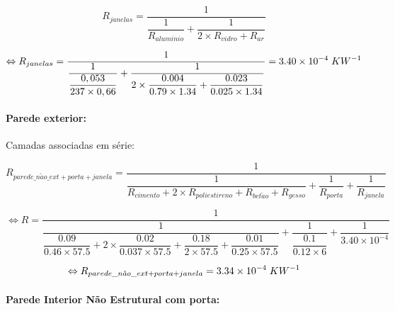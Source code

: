 \documentclass[12pt, a4paper]{article}
\begin{document}
\begin{equation}
	R_{janelas} = \dfrac{1}{\dfrac{1}{R_{aluminio}} + \dfrac{1}{2 \times R_{vidro} + R_{ar}}}
	\label{eq:zona_b_janelas}
\end{equation}

\begin{equation}
	\Leftrightarrow
	R_{janelas} =
	\dfrac{1}{
		\dfrac{1}{
			\dfrac{0,053}{237 \times 0,66}
		}+
		\dfrac{1}{
			2 \times \dfrac{0.004}{0.79 \times 1.34} +
			\dfrac{0.023}{0.025 \times 1.34}
		}
	}
		= 3.40 \times 10^{-4} \hspace{1mm} KW^{-1}
	\label{eq:zona_b_janelas2}
\end{equation}


\paragraph{Parede exterior:}\label{par:zona_b_ext}Camadas associadas em série:

\begin{equation}
    R_{parede\_n\tilde{a}o\_ext + porta + janela} =
        \dfrac{1}{
			\dfrac{1}{
			R_{cimento} + 2 \times R_{poliestireno} + R_{bet\tilde{a}o} + R_{gesso}
			}
			+
			\dfrac{1}{
				R_{porta}
			}
			+
			\dfrac{1}{
				R_{janela}
			}
		}
    \label{eq:zona_b_ext_1}
\end{equation}

\begin{equation}
    \Leftrightarrow R =
        \dfrac{1}{
			\dfrac{1}{
				\dfrac{0.09}{0.46 \times 57.5} +
				2 \times \dfrac{0.02}{0.037 \times 57.5} +
				\dfrac{0.18}{2 \times 57.5} +
				\dfrac{0.01}{0.25 \times 57.5}
        	}
			+
			\dfrac{1}{
            	\dfrac{0.1}{0.12 \times 6}
			}
			+
			\dfrac{1}{
            	3.40 \times 10^{-4}
			}
		}
    \label{eq:zona_b_ext_2}
\end{equation}

\begin{equation}
	\Leftrightarrow R_{parede\_n\tilde{a}o\_ext + porta + janela} = 3.34 \times 10^{-4} \hspace{1mm} KW^{-1}
	\label{eq:zona_b_ext_3}
\end{equation}

\paragraph{Parede Interior N\~ao Estrutural com porta:}\label{par:zona_b_int_n_est}
\end{document}
